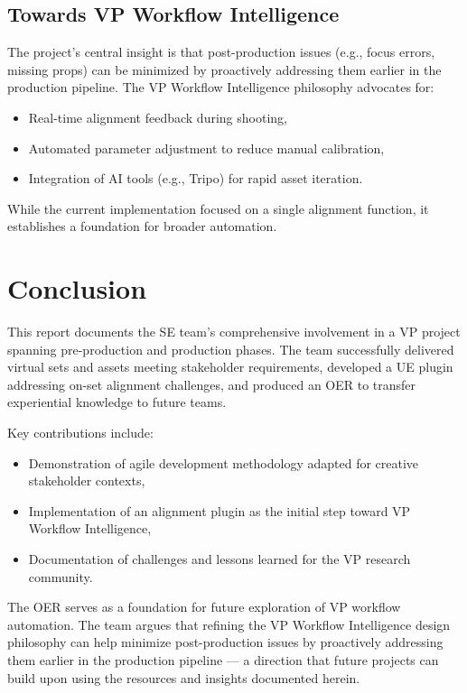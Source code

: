 \documentclass[12pt,a4paper]{report}
\begin{document}
\subsection{Towards VP Workflow Intelligence}
The project's central insight is that post-production issues (e.g., focus errors, missing props) can be minimized by proactively addressing them earlier in the production pipeline. The VP Workflow Intelligence philosophy advocates for:
\begin{itemize}
    \item Real-time alignment feedback during shooting,
    \item Automated parameter adjustment to reduce manual calibration,
    \item Integration of AI tools (e.g., Tripo) for rapid asset iteration.
\end{itemize}
While the current implementation focused on a single alignment function, it establishes a foundation for broader automation.

\section{Conclusion}

This report documents the SE team's comprehensive involvement in a VP project spanning pre-production and production phases. The team successfully delivered virtual sets and assets meeting stakeholder requirements, developed a UE plugin addressing on-set alignment challenges, and produced an OER to transfer experiential knowledge to future teams.

Key contributions include:
\begin{itemize}
    \item Demonstration of agile development methodology adapted for creative stakeholder contexts,
    \item Implementation of an alignment plugin as the initial step toward VP Workflow Intelligence,
    \item Documentation of challenges and lessons learned for the VP research community.
\end{itemize}

The OER serves as a foundation for future exploration of VP workflow automation. The team argues that refining the VP Workflow Intelligence design philosophy can help minimize post-production issues by proactively addressing them earlier in the production pipeline — a direction that future projects can build upon using the resources and insights documented herein.




\end{document}
